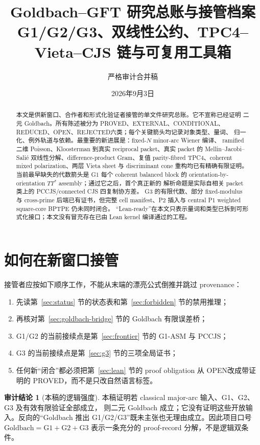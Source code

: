 \documentclass[11pt,a4paper]{ctexart}
\title{Goldbach--GFT 研究总账与接管档案\\
\large G1/G2/G3、双线性公约、TPC4--Vieta--CJS 链与可复用工具箱}
\author{严格审计合并稿}
\date{2026年9月3日}
\theoremstyle{definition}
\newtheorem{audit}[theorem]{审计结论}
\newcommand{\1}{\mathbf 1}
\newcommand{\PROVED}{\textcolor{green!40!black}{\textsf{PROVED}}}
\newcommand{\EXTERNAL}{\textcolor{blue!65!black}{\textsf{EXTERNAL}}}
\newcommand{\CONDITIONAL}{\textcolor{orange!75!black}{\textsf{CONDITIONAL}}}
\newcommand{\REDUCED}{\textcolor{orange!85!black}{\textsf{REDUCED}}}
\newcommand{\OPEN}{\textcolor{red!70!black}{\textsf{OPEN}}}
\newcommand{\REJECTED}{\textcolor{purple!70!black}{\textsf{REJECTED}}}
\begin{document}
\maketitle
\sloppy

\begin{abstract}
本文是供新窗口、合作者和形式化验证者接管的单文件研究总账。它不宣称已经证明
二元 Goldbach。所有陈述被分为 \PROVED、\EXTERNAL、\CONDITIONAL、
\REDUCED、\OPEN、\REJECTED 六类；每个关键箭头均记录对象类型、量词、
归一化、例外轨道与依赖。最重要的新进展是：fixed-$N$ minor-arc Wiener 编译、
ramified 二维 Poisson、Kloosterman 到真实 reciprocal packet、真实 packet 的
Mellin--Jacobi--Sali\'e 双线性分解、difference-product Gram、复值 parity-fibred
TPC4、coherent mixed polarization、两层 Vieta sheet 与 discriminant cone
重构均已有精确有限证明。当前最早缺失的代数箭头是 G1 每个 coherent balanced
block 的 orientation-by-orientation $TT^*$ assembly；通过它之后，首个真正新的
解析命题是实际自相关 packet 类上的 PCCJS/connected CJS 四复制协方差。
G3 的有限代数、部分 fixed-modulus 与 cross-prime 后端已有证书，但完整 cell
manifest、P2 插入与 central P1 weighted square-core BPTPE 仍未同时闭合。
“Lean-ready”在本文只表示量词和类型已拆到可形式化接口；本文没有冒充存在已由
Lean kernel 编译通过的工程。
\end{abstract}

\tableofcontents

\section{如何在新窗口接管}

接管者应按如下顺序工作，不能从末端的漂亮公式倒推并跳过 provenance：
\begin{enumerate}
\item 先读第~\ref{sec:status} 节的状态表和第~\ref{sec:forbidden} 节的禁用推理；
\item 再核对第~\ref{sec:goldbach-bridge} 节的 Goldbach 有限误差桥；
\item G1/G2 的当前接续点是第~\ref{sec:frontier} 节的
  \textup{G1-ASM} 与 \textup{PCCJS}；
\item G3 的当前接续点是第~\ref{sec:g3} 节的三项全局证书；
\item 任何新“闭合”都必须把第~\ref{sec:lean} 节的 proof obligation 从
  \OPEN 改成带证明的 \PROVED，而不是只改自然语言标签。
\end{enumerate}

\begin{audit}[本稿的逻辑强度]
本稿证明若 classical major-arc 输入、G1、G2、G3 及有效有限验证全部成立，
则二元 Goldbach 成立；它没有证明这些开放输入。反向的“Goldbach 推出
G1/G2/G3”既未主张也无理由成立。因此项目口号
\(
\mathrm{Goldbach}=\mathrm{G1}+\mathrm{G2}+\mathrm{G3}
\)
表示一条充分的 proof-record 分解，不是逻辑双条件。
\end{audit}
\end{document}
